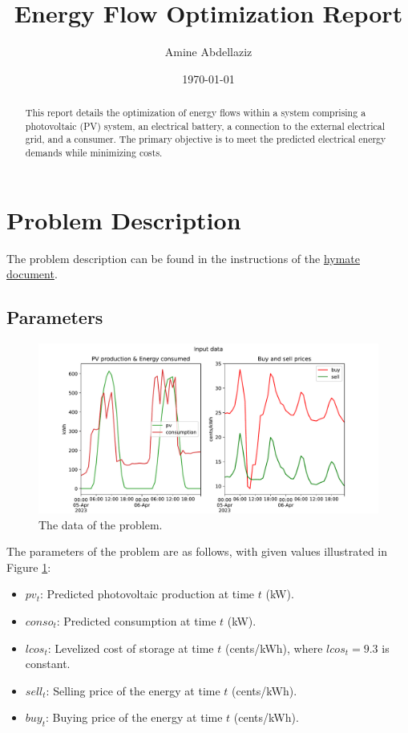 \documentclass[12pt]{article}
\title{Energy Flow Optimization Report}
\author{Amine Abdellaziz}
\date{\today}
\begin{document}
\maketitle

\begin{abstract}
This report details the optimization of energy flows within a system comprising a photovoltaic (PV) system, an electrical battery, a connection to the external electrical grid, and a consumer. The primary objective is to meet the predicted electrical energy demands while minimizing costs.
\end{abstract}

\section{Problem Description}
The problem description can be found in the instructions of the \href{https://github.com/mathaziz/energy_flow_optimization/blob/main/instructions_hymate.pdf}{hymate document}.

\subsection{Parameters}
\begin{figure}[h]
    \centering
    \includegraphics[width=\textwidth]{figs/input_data}
    \caption{The data of the problem.}
    \label{fig:data}
\end{figure}

The parameters of the problem are as follows, with given values illustrated in Figure \ref{fig:data}:
\begin{itemize}
    \item \(pv_t\): Predicted photovoltaic production at time \(t\) (kW).
    \item \(conso_t\): Predicted consumption at time \(t\) (kW).
    \item \(lcos_t\): Levelized cost of storage at time \(t\) (cents/kWh), where \(lcos_t = 9.3\) is constant.
    \item \(sell_t\): Selling price of the energy at time \(t\) (cents/kWh).
    \item \(buy_t\): Buying price of the energy at time \(t\) (cents/kWh).
\end{itemize}
\end{document}
